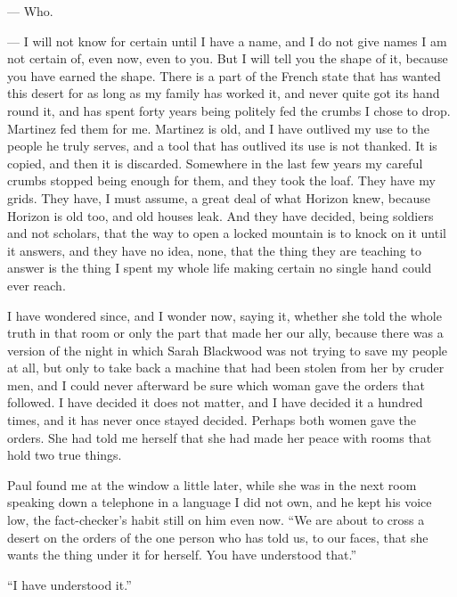\begin{room}

--- Who.

--- I will not know for certain until I have a name, and I do not give names I am not certain of, even now, even to you. But I will tell you the shape of it, because you have earned the shape. There is a part of the French state that has wanted this desert for as long as my family has worked it, and never quite got its hand round it, and has spent forty years being politely fed the crumbs I chose to drop. Martinez fed them for me. Martinez is old, and I have outlived my use to the people he truly serves, and a tool that has outlived its use is not thanked. It is copied, and then it is discarded. Somewhere in the last few years my careful crumbs stopped being enough for them, and they took the loaf. They have my grids. They have, I must assume, a great deal of what Horizon knew, because Horizon is old too, and old houses leak. And they have decided, being soldiers and not scholars, that the way to open a locked mountain is to knock on it until it answers, and they have no idea, none, that the thing they are teaching to answer is the thing I spent my whole life making certain no single hand could ever reach.

\end{room}

I have wondered since, and I wonder now, saying it, whether she told the whole truth in that room or only the part that made her our ally, because there was a version of the night in which Sarah Blackwood was not trying to save my people at all, but only to take back a machine that had been stolen from her by cruder men, and I could never afterward be sure which woman gave the orders that followed. I have decided it does not matter, and I have decided it a hundred times, and it has never once stayed decided. Perhaps both women gave the orders. She had told me herself that she had made her peace with rooms that hold two true things.\par

Paul found me at the window a little later, while she was in the next room speaking down a telephone in a language I did not own, and he kept his voice low, the fact-checker's habit still on him even now. ``We are about to cross a desert on the orders of the one person who has told us, to our faces, that she wants the thing under it for herself. You have understood that.''\par

``I have understood it.''\par

